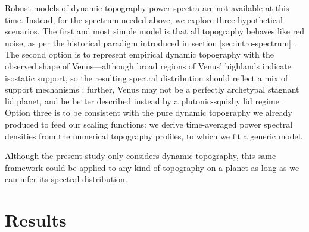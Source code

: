 Robust models of dynamic topography power spectra are not available at this time. Instead, for the spectrum needed above, we explore three hypothetical scenarios. The first and most simple model is that all topography behaves like red noise, as per the historical paradigm introduced in section \ref{sec:intro-spectrum} \citep[e.g.,][]{turcotte_fractal_1987}. The second option is to represent empirical dynamic topography with the observed shape of Venus---although broad regions of Venus' highlands indicate isostatic support, so the resulting spectral distribution should reflect a mix of support mechanisms \citep[e.g.,][]{kiefer_dynamic_1986, arkani-hamed_analysis_1996, simons_localization_1997, yang_separation_2016}; further, Venus may not be a perfectly archetypal stagnant lid planet, and be better described instead by a plutonic-squishy lid regime \citep{lourenco_plutonicsquishy_2020}. Option three is to be consistent with the pure dynamic topography we already produced to feed our scaling functions: we derive time-averaged power spectral densities from the numerical topography profiles, to which we fit a generic model. 






Although the present study only considers dynamic topography, this same framework could be applied to any kind of topography on a planet as long as we can infer its spectral distribution.




\section{Results} \label{sec:results-top}


